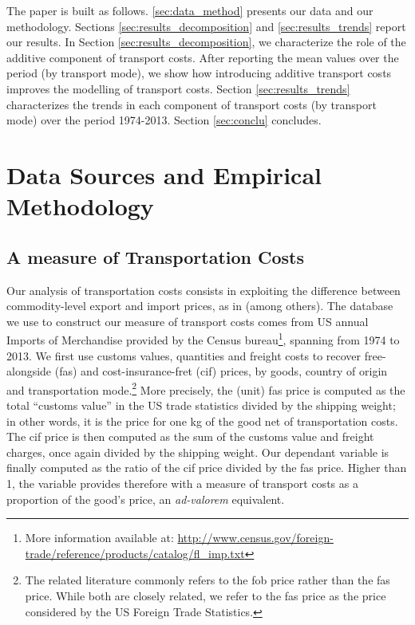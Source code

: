\documentclass[a4paper,11pt]{article}
\begin{document}
The paper is built as follows. \ref{sec:data_method} presents our data and our  methodology. Sections \ref{sec:results_decomposition} and \ref{sec:results_trends} report our results. In Section \ref{sec:results_decomposition}, we characterize the role of the additive component of transport costs. After reporting the mean values over the period (by transport mode), we show how introducing additive transport costs improves the modelling of transport costs. Section \ref{sec:results_trends} characterizes the trends in each component of transport costs (by transport mode) over the period 1974-2013. Section \ref{sec:conclu} concludes.

\section{Data Sources and Empirical Methodology \label{sec:data_method}}

\subsection{A measure of Transportation Costs}

Our analysis of transportation costs consists in exploiting the difference between commodity-level export and import prices, as in \cite{hummels2007} (among others). The database we use to construct our measure of transport costs comes from US annual Imports of Merchandise provided by the Census bureau\footnote{More information available at: \url{http://www.census.gov/foreign-trade/reference/products/catalog/fl_imp.txt}}, spanning from 1974 to 2013. We first use customs values, quantities and freight costs to recover free-alongside (fas) and cost-insurance-fret (cif) prices, by goods, country of origin and transportation mode.\footnote{The related literature commonly refers to the fob price rather than the fas price. While both are closely related, we refer to the fas price as the price considered by the US Foreign Trade Statistics.} More precisely, the (unit) fas price is computed as the total ``customs value'' in the US trade statistics divided by the shipping weight; in other words, it is the price for one kg of the good net of transportation costs. The cif price is then computed as the sum of the customs value and freight charges, once again divided by the shipping weight. Our dependant variable is finally computed as the ratio of the cif price divided by the fas price. Higher than 1, the variable provides therefore with a measure of transport costs as a proportion of the good's price, an \emph{ad-valorem} equivalent.
\end{document}
